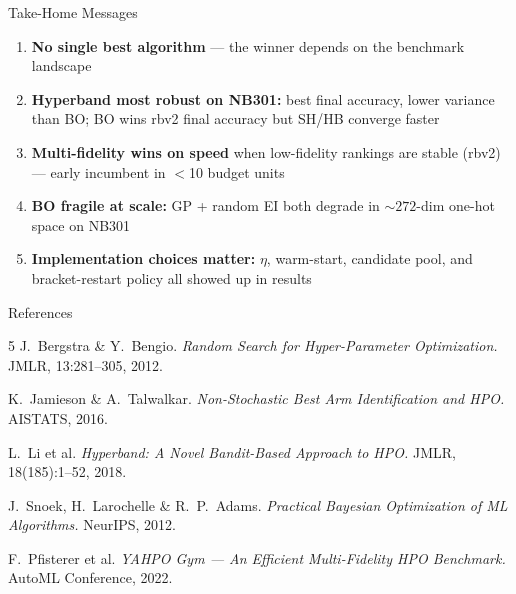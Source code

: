 \documentclass[t,english]{beamer}
\begin{document}
\begin{frame}{Take-Home Messages}
  \small
  \begin{enumerate}[<+->]\setlength\itemsep{5pt}
    \item \textbf{No single best algorithm} — the winner depends on the
          benchmark landscape
    \item \textbf{Hyperband most robust on NB301:} best final accuracy,
          lower variance than BO; BO wins rbv2 final accuracy but SH/HB converge faster
    \item \textbf{Multi-fidelity wins on speed} when low-fidelity rankings
          are stable (rbv2) — early incumbent in $<$10 budget units
    \item \textbf{BO fragile at scale:} GP + random EI both degrade in
          ${\sim}272$-dim one-hot space on NB301
    \item \textbf{Implementation choices matter:} $\eta$, warm-start,
          candidate pool, and bracket-restart policy all showed up in results
  \end{enumerate}
\end{frame}

\appendix

\begin{frame}[allowframebreaks]{References}
  \begin{thebibliography}{5}
    \small
      J.~Bergstra \& Y.~Bengio.
      \textit{Random Search for Hyper-Parameter Optimization.}
      JMLR, 13:281--305, 2012.

      K.~Jamieson \& A.~Talwalkar.
      \textit{Non-Stochastic Best Arm Identification and HPO.}
      AISTATS, 2016.

      L.~Li et al.
      \textit{Hyperband: A Novel Bandit-Based Approach to HPO.}
      JMLR, 18(185):1--52, 2018.

      J.~Snoek, H.~Larochelle \& R.~P.~Adams.
      \textit{Practical Bayesian Optimization of ML Algorithms.}
      NeurIPS, 2012.

      F.~Pfisterer et al.
      \textit{YAHPO Gym — An Efficient Multi-Fidelity HPO Benchmark.}
      AutoML Conference, 2022.
  \end{thebibliography}
\end{frame}
\end{document}

